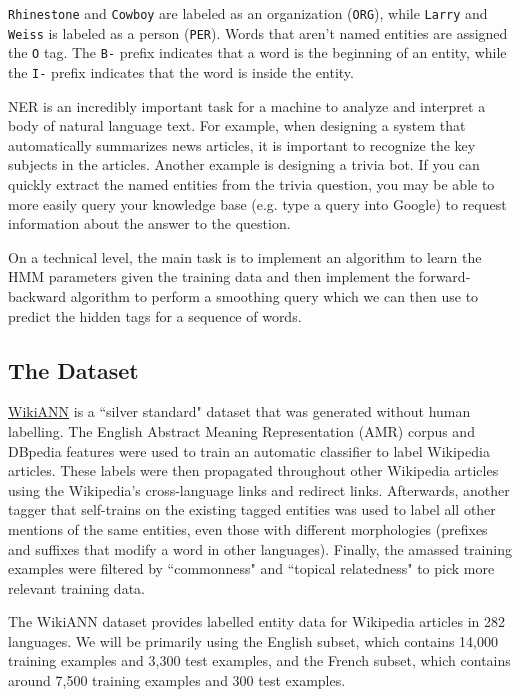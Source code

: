 \documentclass[11pt,addpoints,answers]{exam}
\begin{document}
 \texttt{Rhinestone} and \texttt{Cowboy} are labeled as an organization (\texttt{ORG}), while \texttt{Larry} and \texttt{Weiss} is labeled as a person (\texttt{PER}). Words that aren't named entities are assigned the \texttt{O} tag. The \texttt{B-} prefix indicates that a word is the beginning of an entity, while the \texttt{I-} prefix indicates that the word is inside the entity.

NER is an incredibly important task for a machine to analyze and interpret a body of natural language text. For example, when designing a system that automatically summarizes news articles, it is important to recognize the key subjects in the articles. Another example is designing a trivia bot. If you can quickly extract the named entities from the trivia question, you may be able to more easily query your knowledge base (e.g. type a query into Google) to request information about the answer to the question.

On a technical level, the main task is to implement an algorithm to learn the HMM parameters given the training data and then implement the forward-backward algorithm to perform a smoothing query which we can then use to predict the hidden tags for a sequence of words. 

\subsection{The Dataset}\label{dataset}
\href{https://aclanthology.org/P17-1178.pdf}{WikiANN} is a ``silver standard" dataset that was generated without human labelling. The English Abstract Meaning Representation (AMR) corpus and DBpedia features were used to train an automatic classifier to label Wikipedia articles. These labels were then propagated throughout other Wikipedia articles using the Wikipedia's cross-language links and redirect links. Afterwards, another tagger that self-trains on the existing tagged entities was used to label all other mentions of the same entities, even those with different morphologies (prefixes and suffixes that modify a word in other languages). Finally, the amassed training examples were filtered by ``commonness" and ``topical relatedness" to pick more relevant training data. 

The WikiANN dataset provides labelled entity data for Wikipedia articles in 282 languages. We will be primarily using the English subset, which contains 14,000 training examples and 3,300 test examples, and the French subset, which contains around 7,500 training examples and 300 test examples. 
\end{document}
